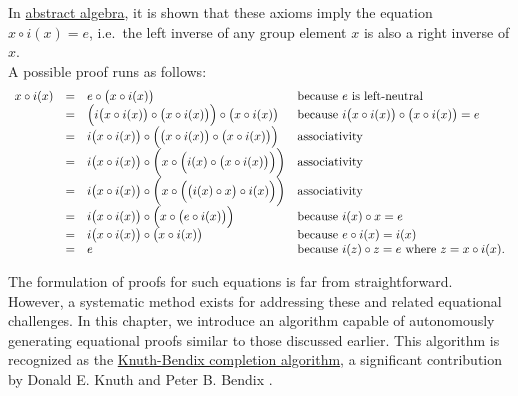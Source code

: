 In \href{https://en.wikipedia.org/wiki/Abstract_algebra}{abstract algebra}, it is shown that these axioms imply
the equation 
\\[0.2cm]
\hspace*{1.3cm}
$x \circ i(x) = e$, \quad i.e.~the left inverse of any group element $x$ is also a right inverse of $x$.
\\[0.2cm]
A possible proof runs as follows:
$$
\begin{array}{lcll}
  x \circ i(x) & = & e \circ \bigl(x \circ i(x)\bigr) & \mbox{because $e$ is left-neutral} \\
               & = & \Bigl(i\bigl(x \circ i(x)\bigr) \circ \bigl(x \circ i(x)\bigr)\Bigr) \circ \bigl(x \circ i(x)\bigr)
                   & \mbox{because $i\bigl(x \circ i(x)\bigr) \circ \bigl(x \circ i(x)\bigr) = e$} \\
               & = & i\bigl(x \circ i(x)\bigr) \circ \Bigl(\bigl(x \circ i(x)\bigr) \circ \bigl(x \circ i(x)\bigr)\Bigr)
                   &  \mbox{associativity} \\
               & = & i\bigl(x \circ i(x)\bigr) \circ \biggl(x \circ \Bigl(i(x) \circ \bigl(x \circ i(x)\bigr)\Bigr)\biggr) 
                   &  \mbox{associativity} \\
               & = & i\bigl(x \circ i(x)\bigr) \circ \biggl(x \circ \Bigl(\bigl(i(x) \circ x\bigr) \circ i(x)\Bigr)\biggr) 
                   &  \mbox{associativity} \\
               & = & i\bigl(x \circ i(x)\bigr) \circ \Bigl(x \circ \bigl(e \circ i(x)\bigr)\Bigr) 
                   &  \mbox{because $i(x) \circ x = e$} \\
               & = & i\bigl(x \circ i(x)\bigr) \circ \bigl(x \circ i(x)\bigr) 
                   &  \mbox{because $e \circ i(x) = i(x)$} \\
               & = & e 
                   & \mbox{because $i(z) \circ z = e$ where $z = x \circ i(x)$.}
\end{array}
$$

The formulation of proofs for such equations is far from straightforward. However, a systematic method exists
for addressing these and related equational challenges. In this chapter, we introduce an algorithm capable of
autonomously generating equational proofs similar to those discussed earlier. This algorithm is recognized as
the \href{https://en.wikipedia.org/wiki/Knuth-Bendix_completion_algorithm}{Knuth-Bendix completion algorithm},
a significant contribution by Donald E. Knuth and Peter B. Bendix \cite{knuth:1970}. 

